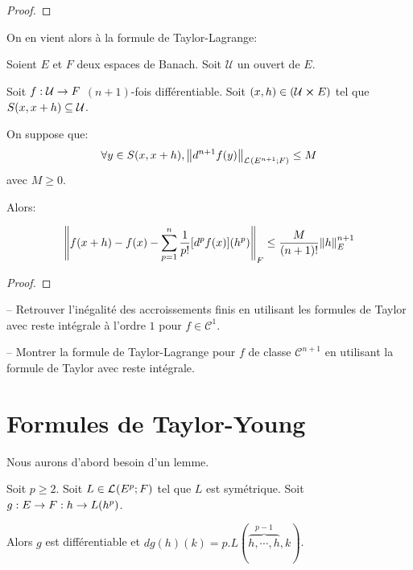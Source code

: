 \ifdefined\outputproof
\begin{proof}

\end{proof}
\fi

On en vient alors à la formule de Taylor-Lagrange:

\begin{theorem} 
	\label{theorem:taylor_lagrange_formula}
	Soient $E$ et $F$ deux espaces de Banach. Soit $\mathcal{U}$ un ouvert de
	$E$.

	Soit $f : \mathcal{U} \rightarrow F$ $(n + 1)$-fois différentiable.
	Soit $(x, h) \in (\mathcal{U} \cross E)$ tel que $S(x, x + h)
	\subseteq \mathcal{U}$.

	On suppose que:
	\begin{equation*}
		\forall y \in S(x, x + h), \norm{d^{n +
		1}f(y)}_{\mathcal{L}_{}(E^{n + 1}; F)} \leq M
	\end{equation*}
	avec $M \geq 0$.

	Alors:

	\begin{equation*}
		\norm{f(x + h) - f(x) - \displaystyle \sum_{p = 1}^{n}
		\frac{1}{p!} [d^{p}f(x)](h^{p})}_{F} \leq \frac{M}{(n + 1)!}
		\norm{h}_{E}^{n + 1}
	\end{equation*}
\end{theorem}

\ifdefined\outputproof
\begin{proof}

\end{proof}
\fi

\begin{exercice}
	-- Retrouver l'inégalité des accroissements finis en utilisant les formules
	de Taylor avec reste intégrale à l'ordre $1$ pour $f \in \mathcal{C}^{1}$.

	-- Montrer la formule de Taylor-Lagrange pour $f$ de classe $\mathcal{C}^{n
	+ 1}$ en utilisant la formule de Taylor avec reste intégrale.
\end{exercice}

\section{Formules de Taylor-Young}

Nous aurons d'abord besoin d'un lemme.

\begin{lemma}
	Soit $p \geq 2$. Soit $L \in \mathcal{L}_{}(E^{p}; F)$ tel que $L$ est
	symétrique.
	Soit $g : E \rightarrow F : h \rightarrow L(h^{p})$.

	Alors $g$ est différentiable et $dg(h)(k) = p.L(\overbrace{h,
	\cdots, h}^{p - 1}, k)$.
\end{lemma}

